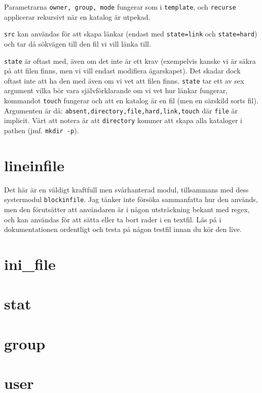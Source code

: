 Parametrarna \verb?owner, group, mode? fungerar som i \texttt{template}, och \texttt{recurse} applicerar rekursivt när en katalog är utpekad.

\texttt{src} kan användas för att skapa länkar (endast med \texttt{state=link} och \texttt{state=hard}) och tar då sökvägen till den fil vi vill länka till.

\texttt{state} är oftast med, även om det inte är ett krav (exempelvis kanske vi är säkra på att filen finns, men vi
vill endast modifiera ägarskapet). Det skadar dock oftast inte att ha den med även om vi vet att filen finns.
\texttt{state} tar ett av sex argument vilka bör vara självförklarande om vi vet hur länkar fungerar, kommandot 
\texttt{touch} fungerar och att en katalog är en fil (men en särskild sorts fil). Argumenten är då:
\verb=absent,directory,file,hard,link,touch= där \texttt{file} är implicit. Värt att notera är att \texttt{directory} kommer att skapa alla kataloger i pathen (jmf. \texttt{mkdir -p}).

\section{lineinfile}
Det här är en väldigt kraftfull men svårhanterad modul, tillsammans med dess systermodul \texttt{blockinfile}. Jag tänker inte försöka sammanfatta hur den används, men den förutsätter att användaren är i någon utsträckning bekant
med regex, och kan användas för att sätta eller ta bort rader i en textfil. Läs på i dokumentationen ordentligt och testa på någon testfil innan du kör den live.

\section{ini_file}

\section{stat}

\section{group}

\section{user}
